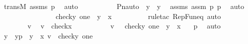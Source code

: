 \begin{isabellebody}
\ transM\ assms\ p{}\ \isamarkupfalse%
\ auto\ \isanewline
\ \ \ \ \ \ \isamarkupfalse%
\ \isamarkupfalse%
\ {\isachardoublequoteopen}Pn{\isacharunderscore}{\kern0pt}auto{\isacharparenleft}{\kern0pt}{\isasympi}{\isacharparenright}{\kern0pt}\ {\isacharbackquote}{\kern0pt}\ y\ {\isacharequal}{\kern0pt}\ y{\isachardoublequoteclose}\ \isamarkupfalse%
\ assms\ assm{}\ p{}\ p{}\ \isamarkupfalse%
\ auto\ \isanewline
\ \ \ \ \isamarkupfalse%
\ \isanewline
\ \ \ \ \isamarkupfalse%
\ \isamarkupfalse%
{\isachardoublequoteopen}{\isachardot}{\kern0pt}{\isachardot}{\kern0pt}{\isachardot}{\kern0pt}\ {\isacharequal}{\kern0pt}\ {\isacharbraceleft}{\kern0pt}\ {\isacharless}{\kern0pt}check{\isacharparenleft}{\kern0pt}y{\isacharparenright}{\kern0pt}{\isacharcomma}{\kern0pt}\ one{\isachargreater}{\kern0pt}\ {\isachardot}{\kern0pt}\ y\ {\isasymin}\ x\ {\isacharbraceright}{\kern0pt}{\isachardoublequoteclose}\ \isanewline
\ \ \ \ \ \ \isamarkupfalse%
\ {\isacharparenleft}{\kern0pt}rule{\isacharunderscore}{\kern0pt}tac\ RepFun{\isacharunderscore}{\kern0pt}eq{\isacharsemicolon}{\kern0pt}\ auto{\isacharparenright}{\kern0pt}\isanewline
\ \ \ \ \isamarkupfalse%
\ {\isacharminus}{\kern0pt}\ \isanewline
\ \ \ \ \ \ \isamarkupfalse%
\ v\ \isamarkupfalse%
\ {\isachardoublequoteopen}v\ {\isasymin}\ check{\isacharparenleft}{\kern0pt}x{\isacharparenright}{\kern0pt}{\isachardoublequoteclose}\ \isanewline
\ \ \ \ \ \ \isamarkupfalse%
\ \isamarkupfalse%
\ {\isachardoublequoteopen}v\ {\isasymin}\ {\isacharbraceleft}{\kern0pt}\ {\isacharless}{\kern0pt}check{\isacharparenleft}{\kern0pt}y{\isacharparenright}{\kern0pt}{\isacharcomma}{\kern0pt}\ one{\isachargreater}{\kern0pt}\ {\isachardot}{\kern0pt}\ y\ {\isasymin}\ x\ {\isacharbraceright}{\kern0pt}{\isachardoublequoteclose}\ \isamarkupfalse%
\ p{}\ \isamarkupfalse%
\ auto\ \isanewline
\ \ \ \ \ \ \isamarkupfalse%
\ \isamarkupfalse%
\ y\ \ yp\ {\isacharcolon}{\kern0pt}\ {\isachardoublequoteopen}y\ {\isasymin}\ x{\isachardoublequoteclose}\ {\isachardoublequoteopen}v\ {\isacharequal}{\kern0pt}\ {\isacharless}{\kern0pt}check{\isacharparenleft}{\kern0pt}y{\isacharparenright}{\kern0pt}{\isacharcomma}{\kern0pt}\ one{\isachargreater}{\kern0pt}{\isachardoublequoteclose}\ \isamarkupfalse%

\end{isabellebody}
